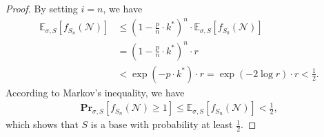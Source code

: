 \documentclass[11pt]{article}
\theoremstyle{definition}
\begin{document}
\begin{proof}
    By setting $i=n$, we have
    $$\begin{aligned}
        \mathbb{E}_{\sigma, S}[f_{S_{n}}(\mathcal{N})] &\leq \left(1-\frac{p}{n}\cdot k^*\right)^{n} \cdot \mathbb{E}_{\sigma, S}[f_{S_0}(\mathcal{N})] \\
        &= \left(1-\frac{p}{n}\cdot k^*\right)^{n} \cdot r \\
        &< \exp(-p\cdot k^*)\cdot r = \exp(-2\log r)\cdot r < \frac{1}{2}.
    \end{aligned}$$
    According to Markov's inequality, we have
    $$\begin{aligned}
        \mathbf{Pr}_{\sigma, S}[f_{S_{n}}(\mathcal{N}) \geq 1] \leq \mathbb{E}_{\sigma, S}[f_{S_{n}}(\mathcal{N})] < \frac{1}{2},
    \end{aligned}$$
    which shows that $S$ is a base with probability at least $\frac{1}{2}$.
\end{proof} 
\end{document}
